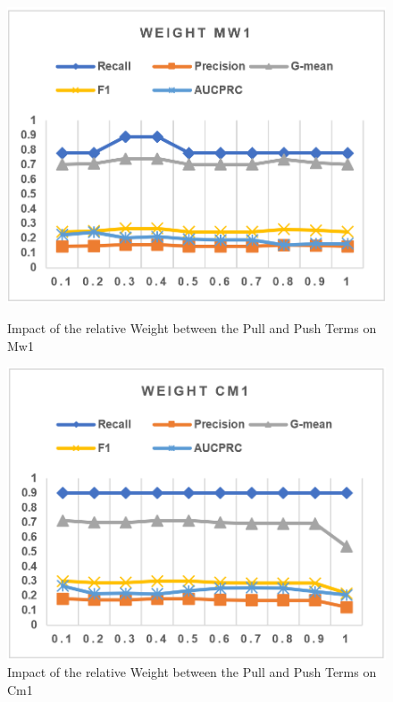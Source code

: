 \begin{figure}[h]
    \centering 
    \begin{minipage}{0.45\textwidth}
        \includegraphics[width=\textwidth]{images/fig32}
        \caption{Impact of the relative Weight between the Pull and Push Terms on Mw1}
        \label{fig32}
    \end{minipage}
    \quad
    \begin{minipage}{0.45\textwidth}
        \includegraphics[width=\textwidth]{images/fig33}
        \caption{Impact of the relative Weight between the Pull and Push Terms on Cm1}
        \label{fig33}
    \end{minipage}
\end{figure}

